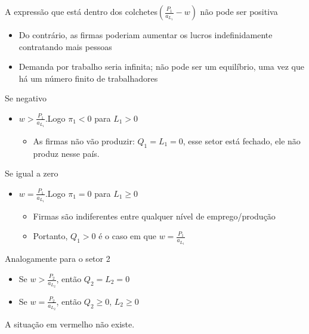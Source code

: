 \documentclass[a4paper,12pt]{article}[abntex2]
\begin{document}
A expressão que está dentro dos colchetes\((\frac{P_1}{a_{L_1}}-w)\) não pode ser positiva\begin{itemize}
    \item Do contrário, as firmas poderiam aumentar os lucros indefinidamente contratando mais pessoas
    \item Demanda por trabalho seria infinita; não pode ser um equilíbrio, uma vez que há um número finito de trabalhadores
\end{itemize}

Se negativo\begin{itemize}
    \item \(w>\frac{P_1}{a_{L_1}}\).Logo \(\pi_1<0\) para \(L_1>0\)\begin{itemize}
        \item As firmas não vão produzir: \(Q_1=L_1=0\), esse setor está fechado, ele não produz nesse país.
    \end{itemize}
\end{itemize}

Se igual a zero\begin{itemize}
    \item \(w=\frac{P_1}{a_{L_1}}\).Logo \(\pi_1=0\) para \(L_1\ge0\)\begin{itemize}
        \item Firmas são indiferentes entre qualquer nível de emprego/produção
        \item Portanto, \(Q_1>0\) é o caso em que \(w=\frac{P_1}{a_{L_1}}\)
    \end{itemize}
\end{itemize}

Analogamente para o setor 2\begin{itemize}
    \item Se \(w>\frac{P_2}{a_{L_2}}\), então \(Q_2=L_2=0\)
    \item Se \(w=\frac{P_2}{a_{L_2}}\), então \(Q_2\ge 0\), \(L_2\ge 0\)
\end{itemize}

A situação em vermelho não existe.
\end{document}
